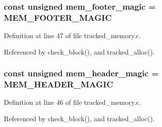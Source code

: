 \subsubsection[{mem\-\_\-footer\-\_\-magic}]{\setlength{\rightskip}{0pt plus 5cm}const unsigned mem\-\_\-footer\-\_\-magic = {\bf M\-E\-M\-\_\-\-F\-O\-O\-T\-E\-R\-\_\-\-M\-A\-G\-I\-C}}\label{tracked__memory_8c_a89ab5016ef388d7a5691e4d77208cc32}


Definition at line 47 of file tracked\-\_\-memory.\-c.



Referenced by check\-\_\-block(), and tracked\-\_\-alloc().

\subsubsection[{mem\-\_\-header\-\_\-magic}]{\setlength{\rightskip}{0pt plus 5cm}const unsigned mem\-\_\-header\-\_\-magic = {\bf M\-E\-M\-\_\-\-H\-E\-A\-D\-E\-R\-\_\-\-M\-A\-G\-I\-C}}\label{tracked__memory_8c_ac870dbfc709df78d9ee713843f55e894}


Definition at line 46 of file tracked\-\_\-memory.\-c.



Referenced by check\-\_\-block(), and tracked\-\_\-alloc().


